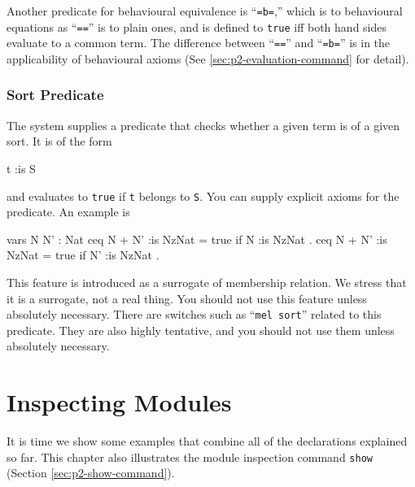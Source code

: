 \documentclass[a4paper]{memoir}
\begin{document}
Another predicate for behavioural equivalence is ``\verb|=b=|,''
which is to behavioural equations as ``\verb|==|'' is to plain ones, and is
defined to \verb|true| iff both hand sides evaluate to a common
term. The difference between ``\verb|==|'' and ``\verb|=b=|''
is in the applicability of behavioural axioms
(See \ref{sec:p2-evaluation-command} for detail).

\subsection{Sort Predicate}\label{sec:p2-sort-pred}

The system supplies a predicate that checks whether a given
term is of a given sort. It is of the form
\begin{vvtm}
\begin{ccode}
  t :is S
\end{ccode}
\end{vvtm}
and evaluates to \verb|true| if \verb|t| belongs to \verb|S|.
You can supply explicit axioms for the predicate. An example is
\begin{vvtm}
\begin{ccode}
  vars N N' : Nat
  ceq N + N' :is NzNat = true if N :is NzNat .
  ceq N + N' :is NzNat = true if N' :is NzNat .
\end{ccode}
\end{vvtm}

\begin{warning}
  This feature is introduced as a surrogate of membership relation.
  We stress that it is a surrogate, not a real thing.
  You should not use this feature unless absolutely necessary.
  There are switches such as ``\verb|mel sort|'' related to
  this predicate. They are also highly tentative, and you should not
  use them unless absolutely necessary.
\end{warning}

\chapter{Inspecting Modules}\label{sec:p2-inspect-module}

It is time we show some examples that combine all of the
declarations explained so far. This chapter also illustrates
the module inspection command \verb|show| (Section \ref{sec:p2-show-command}).
\end{document}
